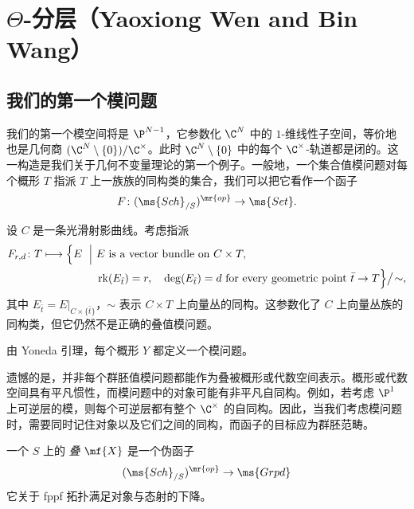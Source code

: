 \section{\(\Theta\)-分层（Yaoxiong Wen and Bin Wang）}%
\label{sec:Theta-stratifications}

\subsection{我们的第一个模问题}%
\label{sub:Our first moduli problem}

我们的第一个模空间将是 \(\P^{N-1}\)，它参数化 \(\C^N\) 中的 \(1\)-维线性子空间，等价地也是几何商 \((\C^N \setminus \{0\}) / \C^{\times}\)。此时 \(\C^N\setminus\{0\}\) 中的每个 \(\C^{\times}\)-轨道都是闭的。这一构造是我们关于几何不变量理论的第一个例子。一般地，一个集合值模问题对每个概形 \(T\) 指派 \(T\) 上一族族的同构类的集合，我们可以把它看作一个函子
\[ F \colon (\ms{Sch}_{/S})^{\mr{op}} \to \ms{Set}. \]

\begin{exm}
    设 \(C\) 是一条光滑射影曲线。考虑指派
    \[
    \begin{aligned}
        F_{r,d}\colon T \longmapsto
        \Bigl\{
        E \ \Bigm|\ &
        E \text{ is a vector bundle on } C\times T,\\
        &\operatorname{rk}(E_{\bar t})=r,\quad \deg(E_{\bar t})=d
        \text{ for every geometric point } \bar t\to T
        \Bigr\}\big/\!\sim,
    \end{aligned}
    \]
    其中 \(E_{\bar t}=E|_{C\times\{\bar t\}}\)，\(\sim\) 表示 \(C\times T\) 上向量丛的同构。这参数化了 \(C\) 上向量丛族的同构类，但它仍然不是正确的叠值模问题。
\end{exm}

\begin{exm}
    由 Yoneda 引理，每个概形 \(Y\) 都定义一个模问题。
\end{exm}

遗憾的是，并非每个群胚值模问题都能作为叠被概形或代数空间表示。概形或代数空间具有平凡惯性，而模问题中的对象可能有非平凡自同构。例如，若考虑 \(\P^1\) 上可逆层的模，则每个可逆层都有整个 \(\C^{\times}\) 的自同构。因此，当我们考虑模问题时，需要同时记住对象以及它们之间的同构，而函子的目标应为群胚范畴。

\begin{defn}[informal]
    一个 \(S\) 上的 \textit{叠} \(\mf{X}\) 是一个伪函子
    \[ (\ms{Sch}_{/S})^{\mr{op}} \to \ms{Grpd} \]
    它关于 fppf 拓扑满足对象与态射的下降。
\end{defn}

